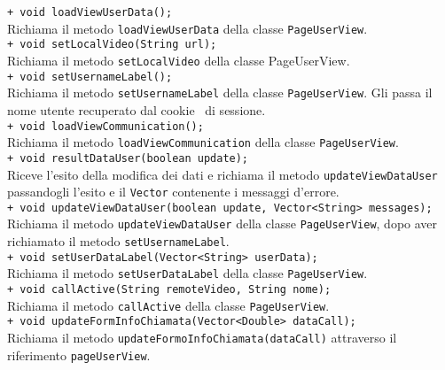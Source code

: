 {{\begin{sloppypar}
{{{\begin{itemize}
{					\texttt{+ void loadViewUserData();}\\
					Richiama il metodo \texttt{loadViewUserData} della classe \texttt{PageUserView}.\\
					
					\texttt{+ void setLocalVideo(String url);}\\
					Richiama il metodo \texttt{setLocalVideo} della classe PageUserView.\\

					\texttt{+ void setUsernameLabel();}\\
					Richiama il metodo \texttt{setUsernameLabel} della classe \texttt{PageUserView}. Gli passa il nome utente recuperato dal cookie\g~ di sessione.\\
					
					\texttt{+ void loadViewCommunication();}\\
					Richiama il metodo \texttt{loadViewCommunication} della classe \texttt{PageUserView}.\\

					\texttt{+ void resultDataUser(boolean update);}\\
					Riceve l'esito della modifica dei dati e richiama il metodo \texttt{updateViewDataUser} passandogli l'esito e il \texttt{Vector} contenente i messaggi d'errore.\\
					
					\texttt{+ void updateViewDataUser(boolean update, Vector<String> messages);}\\
					Richiama il metodo \texttt{updateViewDataUser} della classe \texttt{PageUserView}, dopo aver richiamato il metodo \texttt{setUsernameLabel}.\\
					
					\texttt{+ void setUserDataLabel(Vector<String> userData);}\\
					Richiama il metodo \texttt{setUserDataLabel} della classe \texttt{PageUserView}.\\
					
					\texttt{+ void callActive(String remoteVideo, String nome);}\\
					Richiama il metodo \texttt{callActive} della classe \texttt{PageUserView}.\\
					
					\texttt{+ void updateFormInfoChiamata(Vector<Double> dataCall);}\\
					Richiama il metodo \texttt{updateFormoInfoChiamata(dataCall)} attraverso il riferimento \texttt{pageUserView}.\\
					
}
\end{itemize}}}}
\end{sloppypar}}}
